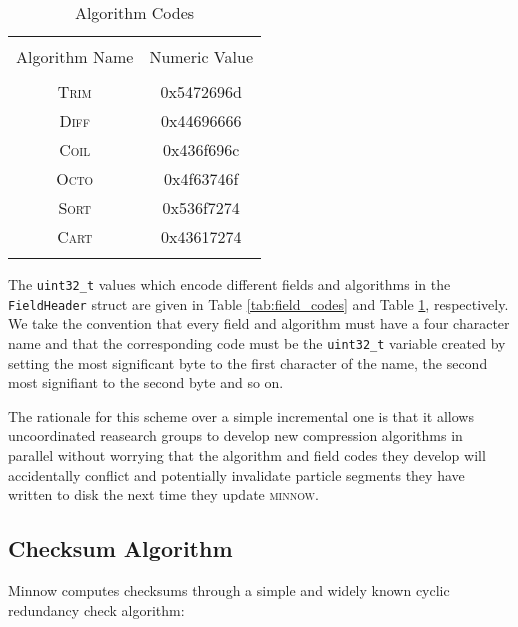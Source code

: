\documentclass[numberedappendix,apj]{emulateapj}
\begin{document}
\begin{table}
   \centering
   \caption{Algorithm Codes}
   \label{tab:algorithm_codes}
   \begin{tabular}{cc}
   \hline
   \hline       
   \\
   Algorithm Name & Numeric Value
   \\
   \hline
   \\
   \textsc{Trim} & 0x5472696d \\
   \textsc{Diff} & 0x44696666 \\
   \textsc{Coil} & 0x436f696c \\
   \textsc{Octo} & 0x4f63746f \\
   \textsc{Sort} & 0x536f7274 \\
   \textsc{Cart} & 0x43617274
   \\
   \hline
   \\
   \end{tabular}
\end{table}

The \texttt{uint32\_t} values which encode different fields and algorithms in
the \texttt{FieldHeader} struct are given in Table \ref{tab:field_codes} and
Table \ref{tab:algorithm_codes}, respectively. We take the convention that
every field and algorithm must have a four character name and that the
corresponding code must be the \texttt{uint32\_t} variable created by setting
the most significant byte to the first character of the name, the second most
signifiant to the second byte and so on.

The rationale for this scheme over a simple incremental one is that it allows
uncoordinated reasearch groups to develop new compression algorithms in parallel
without worrying that the algorithm and field codes they develop will
accidentally conflict and potentially invalidate particle segments they have 
written to disk the next time they update \textsc{minnow}.


\subsection{Checksum Algorithm}
\label{sec:checksum}

Minnow computes checksums through a simple and widely known cyclic redundancy
check algorithm:
\end{document}
